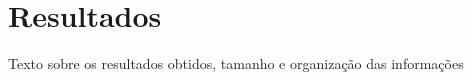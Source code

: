 \chapter{Resultados}
Texto sobre os resultados obtidos, tamanho e organiza\c{c}\~{a}o das informa\c{c}\~{o}es